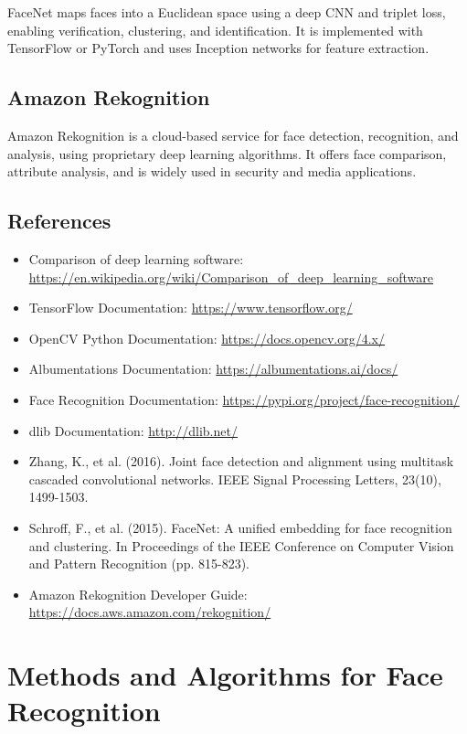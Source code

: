 FaceNet maps faces into a Euclidean space using a deep CNN and triplet loss, enabling verification, clustering, and identification. It is implemented with TensorFlow or PyTorch and uses Inception networks for feature extraction.

\subsection{Amazon Rekognition}

Amazon Rekognition is a cloud-based service for face detection, recognition, and analysis, using proprietary deep learning algorithms. It offers face comparison, attribute analysis, and is widely used in security and media applications.

\subsection{References}
\begin{itemize}
    \item Comparison of deep learning software: \url{https://en.wikipedia.org/wiki/Comparison_of_deep_learning_software}
    \item TensorFlow Documentation: \url{https://www.tensorflow.org/}
    \item OpenCV Python Documentation: \url{https://docs.opencv.org/4.x/}
    \item Albumentations Documentation: \url{https://albumentations.ai/docs/}
    \item Face Recognition Documentation: \url{https://pypi.org/project/face-recognition/}
    \item dlib Documentation: \url{http://dlib.net/}
    \item Zhang, K., et al. (2016). Joint face detection and alignment using multitask cascaded convolutional networks. IEEE Signal Processing Letters, 23(10), 1499-1503.
    \item Schroff, F., et al. (2015). FaceNet: A unified embedding for face recognition and clustering. In Proceedings of the IEEE Conference on Computer Vision and Pattern Recognition (pp. 815-823).
    \item Amazon Rekognition Developer Guide: \url{https://docs.aws.amazon.com/rekognition/}
\end{itemize}

\section{Methods and Algorithms for Face Recognition}

